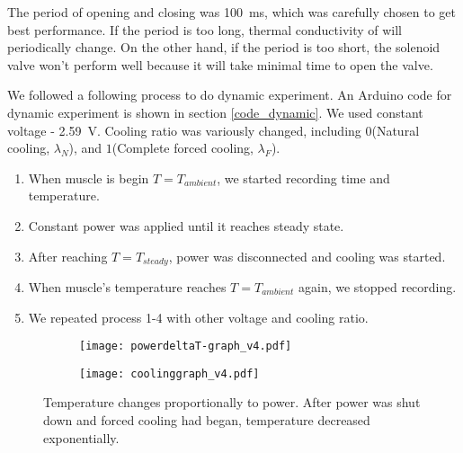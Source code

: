The period of opening and closing was \SI{100}{\milli\second}, which was carefully chosen to get best performance. If the period is too long, thermal conductivity of \scp will periodically change. On the other hand, if the period is too short, the solenoid valve won't perform well because it will take minimal time to open the valve. 

We followed a following process to do dynamic experiment. An Arduino code for dynamic experiment is shown in section \ref{code_dynamic}. We used constant voltage - \SI{2.59}{\volt}. Cooling ratio was variously changed, including $0$(Natural cooling, $\lambda_{N}$), and $1$(Complete forced cooling, $\lambda_{F}$). 
\begin{enumerate}
\item When muscle is begin $T=T_{ambient}$, we started recording time and temperature.
\item Constant power was applied until it reaches steady state.
\item After reaching $T=T_{steady}$, power was disconnected and cooling was started. 
\item When muscle's temperature reaches $T=T_{ambient}$ again, we stopped recording. 
\item We repeated process 1-4 with other voltage and cooling ratio.
\end{enumerate}


\begin{figure}[t]
	\centering
	\begin{subfigure}[t]{0.4\linewidth}
		\centering\texttt{[image: powerdeltaT-graph\_v4.pdf]}
		\caption{\label{powerdeltaT}}
	\end{subfigure}%
	\begin{subfigure}[t]{0.4\linewidth}
		\centering\texttt{[image: coolinggraph\_v4.pdf]}
		\caption{\label{coolinggraph}}
	\end{subfigure}
	\caption[Results of dynamic experiment]{ Temperature changes proportionally to power.  After power was shut down and forced cooling had began, temperature decreased exponentially.}
	\label{result_dynamic}
\end{figure}

